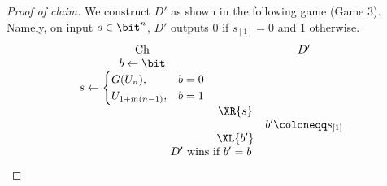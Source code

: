 \begin{answer}[i]
\begin{proof}[Proof of claim]
    We construct $D'$ as shown in the following game (Game $3$). Namely, on input $s\in\bit^n$, $D'$ outputs $0$ if $s_{[1]}=0$ and $1$ otherwise.
    {
        \[
            \begin{array}{@{} c c c @{}}
            \text{Ch} & & D' \\
            b \leftarrow \bit & & \\
            s \leftarrow \begin{cases} 
                G(U_n), &b = 0 \\
                U_{1+m(n-1)}, &b = 1 
            \end{cases} & & \\
            & \XR{s} & \\
            & & b'\coloneqq s_{[1]} \\
            & \XL{b'} & \\
            \multicolumn{3}{c}{\text{$D'$ wins if $b' = b$}}
        \end{array}
        \]
        \label{fig:p3-game3}
    }
    

\end{proof}
\end{answer}

